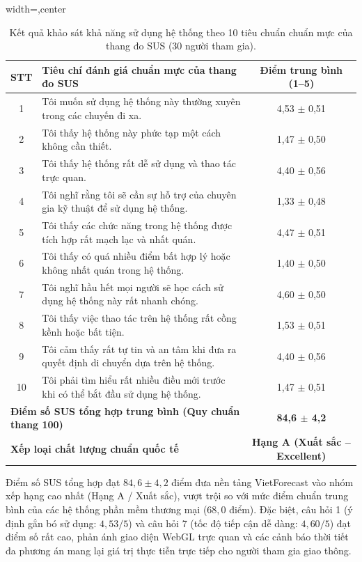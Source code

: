 \begin{table}[htbp]
\centering
\caption[Kết quả khảo sát khả năng sử dụng hệ thống theo thang đo SUS]{Kết quả khảo sát khả năng sử dụng hệ thống theo 10 tiêu chuẩn chuẩn mực của thang đo SUS (30 người tham gia).}
\label{tab:sus_evaluation_vi}
\begin{adjustbox}{width=\textwidth,center}
\begin{tabular}{clc}
\toprule
\textbf{STT} & \textbf{Tiêu chí đánh giá chuẩn mực của thang đo SUS} & \textbf{Điểm trung bình (1--5)} \\
\midrule
1  & Tôi muốn sử dụng hệ thống này thường xuyên trong các chuyến đi xa. & 4,53 $\pm$ 0,51 \\
2  & Tôi thấy hệ thống này phức tạp một cách không cần thiết. & 1,47 $\pm$ 0,50 \\
3  & Tôi thấy hệ thống rất dễ sử dụng và thao tác trực quan. & 4,40 $\pm$ 0,56 \\
4  & Tôi nghĩ rằng tôi sẽ cần sự hỗ trợ của chuyên gia kỹ thuật để sử dụng hệ thống. & 1,33 $\pm$ 0,48 \\
5  & Tôi thấy các chức năng trong hệ thống được tích hợp rất mạch lạc và nhất quán. & 4,47 $\pm$ 0,51 \\
6  & Tôi thấy có quá nhiều điểm bất hợp lý hoặc không nhất quán trong hệ thống. & 1,40 $\pm$ 0,50 \\
7  & Tôi nghĩ hầu hết mọi người sẽ học cách sử dụng hệ thống này rất nhanh chóng. & 4,60 $\pm$ 0,50 \\
8  & Tôi thấy việc thao tác trên hệ thống rất cồng kềnh hoặc bất tiện. & 1,53 $\pm$ 0,51 \\
9  & Tôi cảm thấy rất tự tin và an tâm khi đưa ra quyết định di chuyển dựa trên hệ thống. & 4,40 $\pm$ 0,56 \\
10 & Tôi phải tìm hiểu rất nhiều điều mới trước khi có thể bắt đầu sử dụng hệ thống. & 1,47 $\pm$ 0,51 \\
\midrule
\multicolumn{2}{l}{\textbf{Điểm số SUS tổng hợp trung bình (Quy chuẩn thang 100)}} & \textbf{84,6 $\pm$ 4,2} \\
\multicolumn{2}{l}{\textbf{Xếp loại chất lượng chuẩn quốc tế}} & \textbf{Hạng A (Xuất sắc -- Excellent)} \\
\bottomrule
\end{tabular}
\end{adjustbox}
\end{table}

Điểm số SUS tổng hợp đạt $84,6 \pm 4,2$ điểm đưa nền tảng VietForecast vào nhóm xếp hạng cao nhất (Hạng A / Xuất sắc), vượt trội so với mức điểm chuẩn trung bình của các hệ thống phần mềm thương mại ($68,0$ điểm). Đặc biệt, câu hỏi 1 (ý định gắn bó sử dụng: $4,53/5$) và câu hỏi 7 (tốc độ tiếp cận dễ dàng: $4,60/5$) đạt điểm số rất cao, phản ánh giao diện WebGL trực quan và các cảnh báo thời tiết đa phương án mang lại giá trị thực tiễn trực tiếp cho người tham gia giao thông.

